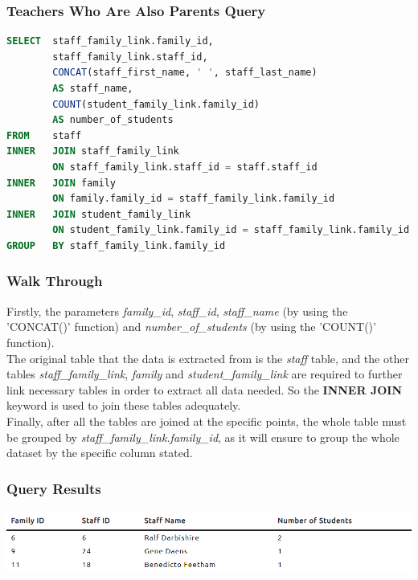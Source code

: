 \documentclass{article}
\begin{document}
\subsubsection{Teachers Who Are Also Parents Query}
\begin{lstlisting}[language=sql, caption=Teachers Who Are Also Parents Query, style=mystyle]
SELECT  staff_family_link.family_id, 
        staff_family_link.staff_id, 
        CONCAT(staff_first_name, ' ', staff_last_name)
        AS staff_name, 
        COUNT(student_family_link.family_id) 
        AS number_of_students 
FROM    staff
INNER   JOIN staff_family_link 
        ON staff_family_link.staff_id = staff.staff_id
INNER   JOIN family 
        ON family.family_id = staff_family_link.family_id
INNER   JOIN student_family_link 
        ON student_family_link.family_id = staff_family_link.family_id
GROUP   BY staff_family_link.family_id
\end{lstlisting} 

\subsubsection{Walk Through} Firstly, the parameters \textit{family\_id}, \textit{staff\_id}, \textit{staff\_name} (by using the 'CONCAT()' \gls{function}) and \textit{number\_of\_students} (by using the 'COUNT()' \gls{function}).
\\\newline
The original table that the data is extracted from is the \textit{staff} table, and the other tables \textit{staff\_family\_link}, \textit{family} and \textit{student\_family\_link} are required to further link necessary tables in order to extract all data needed. So the \textbf{INNER JOIN} keyword is used to join these tables adequately.
\\\newline
Finally, after all the tables are joined at the specific points, the whole table must be grouped by \textit{staff\_family\_link.family\_id}, as it will ensure to group the whole dataset by the specific column stated.

\subsubsection{Query Results}
\includegraphics[width=\linewidth]{images/07.png}
\end{document}

